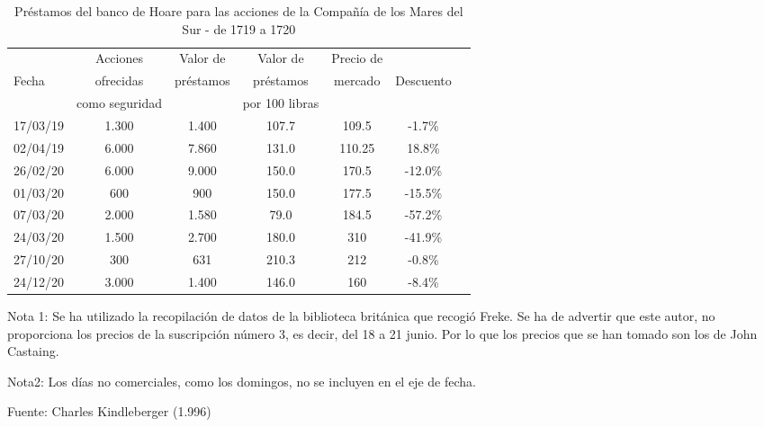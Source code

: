 \begin{table}
    \begin{tabular}{lcccccc}
             & Acciones           & Valor de  & Valor de       & Precio de &  \\
    Fecha    & ofrecidas          & préstamos & préstamos      & mercado   & Descuento        \\
             & como seguridad     &           & por 100 libras &           &           \\ 
    \cline{2-6}
    17/03/19 & 1.300              & 1.400     & 107.7          & 109.5     & -1.7\%    \\
    02/04/19 & 6.000              & 7.860     & 131.0          & 110.25    & 18.8\%    \\
    26/02/20 & 6.000              & 9.000     & 150.0          & 170.5     & -12.0\%   \\
    01/03/20 & 600                & 900       & 150.0          & 177.5     & -15.5\%   \\
    07/03/20 & 2.000              & 1.580     & 79.0           & 184.5     & -57.2\%   \\
    24/03/20 & 1.500              & 2.700     & 180.0          & 310       & -41.9\%   \\
    27/10/20 & 300                & 631       & 210.3          & 212       & -0.8\%    \\
    24/12/20 & 3.000              & 1.400     & 146.0          & 160       & -8.4\%    \\
    \hline
    \end{tabular}

\footnotesize

\vspace{3 mm}
Nota 1: Se ha utilizado la recopilación de datos de la biblioteca británica que recogió Freke. Se ha de advertir que este autor, no proporciona los precios de la suscripción número 3, es decir, del 18 a 21 junio. Por lo que los precios que se han tomado son los de John Castaing.
\vspace{3 mm}

Nota2: Los días no comerciales, como los domingos, no se incluyen en el eje de fecha.

\center
Fuente: Charles Kindleberger (1.996)


\caption {Préstamos del banco de Hoare para las acciones de la Compañía de los Mares del Sur - de 1719 a 1720}
\label{tab:prestamosHoare}
		
\end{table}


